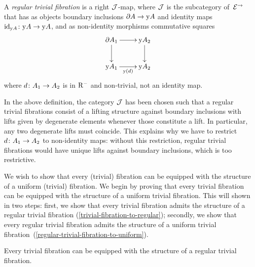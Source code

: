 \documentclass[reqno,10pt,a4paper,oneside,draft]{amsart}
\begin{document}
\begin{definition}
A \emph{regular trivial fibration} is a right $\cal{J}$-map, where $\cal{J}$ is the subcategory of~$\catE^{\to}$ that has as objects boundary inclusions $\partial A \to \yon A$ and identity maps $\id_{\yon A} \co \yon A \to \yon A$, and as non-identity morphisms commutative squares
\[
\xymatrix{
  \partial A_1
  \ar[r]
  \ar[d]
&
  \yon A_2
  \ar[d]
\\
  \yon A_1
  \ar[r]_{\yon(d)}
&
  \yon A_2
}
\]
where $d \co A_1 \to A_2$ is in $\Rm$ and non-trivial, \ie not an identity map.
\end{definition}

In the above definition, the category $\cal{J}$ has been chosen such that a regular trivial fibrations consist of a lifting structure against boundary inclusions with lifts given by degenerate elements whenever those constitute a lift.
In particular, any two degenerate lifts must coincide.
This explains why we have to restrict $d \co A_1 \to A_2$ to non-identity maps: without this restriction, regular trivial fibrations would have unique lifts against boundary inclusions, which is too restrictive.



We wish to show that every (trivial) fibration  can be equipped with the structure of a uniform (trivial) fibration. We begin by proving that every trivial fibration  can be equipped with the structure of a uniform trivial fibration. This will shown in two steps: first,  we show that 
every trivial fibration admits the structure of a regular trivial fibration (\cref{trivial-fibration-to-regular}); secondly, we show
that every regular trivial fibration admits the structure of a uniform trivial 
fibration~(\cref{regular-trivial-fibration-to-uniform}). 


\begin{proposition} \label{trivial-fibration-to-regular}
Every trivial fibration can be equipped with the structure of a regular trivial fibration.
\end{proposition}
\end{document}
